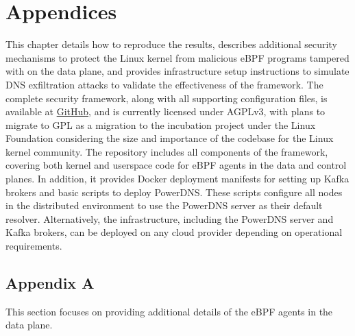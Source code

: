 \documentclass [11pt, proquest] {uwthesis}[2020/02/24]
\begin{document}
 





\chapter{Appendices}

This chapter details how to reproduce the results, describes additional security mechanisms to protect the Linux kernel from malicious eBPF programs tampered with on the data plane, and provides infrastructure setup instructions to simulate DNS exfiltration attacks to validate the effectiveness of the framework.
The complete security framework, along with all supporting configuration files, is available at \href{https://github.com/Synarcs/DNSObelisk}{GitHub}, and is currently licensed under AGPLv3, with plans to migrate to GPL as a migration to the incubation project under the Linux Foundation considering the size and importance of the codebase for the Linux kernel community. The repository includes all components of the framework, covering both kernel and userspace code for eBPF agents in the data and control planes. In addition, it provides Docker deployment manifests for setting up Kafka brokers and basic scripts to deploy PowerDNS. These scripts configure all nodes in the distributed environment to use the PowerDNS server as their default resolver. Alternatively, the infrastructure, including the PowerDNS server and Kafka brokers, can be deployed on any cloud provider depending on operational requirements.


\section{Appendix A}
This section focuses on providing additional details of the eBPF agents in the data plane.
\end{document}
